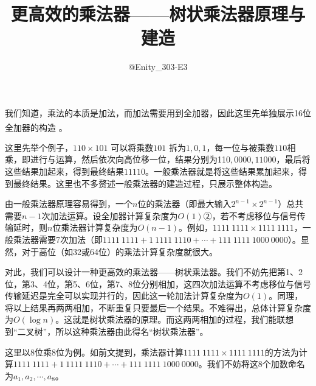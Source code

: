 \documentclass[UTF8, 12pt, punct=kaiming, fontset=none]{article}
\title{\vspace{-1.5cm}更高效的乘法器——树状乘法器原理与建造\vspace{-0.5cm}}
\author{\ds @Enity\_303-E3}
\date{}
\newcommand*{\upcite}[1]{
    \textsuperscript{\cite{#1}}
}
\begin{document}
    \maketitle
    \thispagestyle{fancy} %
    \vspace{-0.7cm}

    \titleformat{\section}[hang]{\large\sffamily\bfseries}{\textmd{\ds\thesection}}{0.5cm}{}
    \titlespacing{\section}{0cm}{0.5ex}{0.2ex}
    \setcounter{section}{-1}

    我们知道，乘法的本质是加法，而加法需要用到全加器，因此这里先单独展示16位全加器的构造\upcite{full_adder}。

    这里先举个例子，$110\times101$ 可以将乘数$101$ 拆为$1,0,1$，每一位与被乘数$110$相乘，即进行与运算，然后依次向高位移一位，结果分别为11$0,0000,11000$，最后将这些结果加起来，得到最终结果$11110$。一般乘法器就是将这些结果累加起来，得到最终结果。这里也不多赘述一般乘法器的建造过程，只展示整体构造。

    由一般乘法器原理容易得到，一个$n$位的乘法器（即最大输入$2^{n-1}\times2^{n-1}$）总共需要$n-1$次加法运算。设全加器计算复杂度为$O(1)$②，若不考虑移位与信号传输延时，则$n$位乘法器计算复杂度为$O(n-1)$。例如，$1111\ 1111\times1111\ 1111$，一般乘法器需要7次加法（即$1111\ 1111+1\ 1111\ 1110+\cdots+111\ 1111\ 1000\ 0000$）。显然，对于高位（如32或64位）的乘法计算复杂度就很大。
    
    对此，我们可以设计一种更高效的乘法器——树状乘法器。我们不妨先把第1、2位，第3、4位，第5、6位，第7、8位分别相加，这四次加法运算不考虑移位与信号传输延迟是完全可以实现并行的，因此这一轮加法计算复杂度为$O(1)$。同理，将以上结果再两两相加，不断重复只要最后一个结果。不难得出，总体计算复杂度为$O(\log n)$。这就是树状乘法器的原理。而这两两相加的过程，我们能联想到“二叉树”，所以这种乘法器由此得名“树状乘法器”。

    这里以8位乘8位为例。如前文提到，乘法器计算$1111\ 1111\times1111\ 1111$的方法为计算$1111\ 1111+1\ 1111\ 1110+\cdots+111\ 1111\ 1000\ 0000$。我们不妨将这8个加数命名为$a_1,a_2,\cdots,a_8$。
\end{document}
